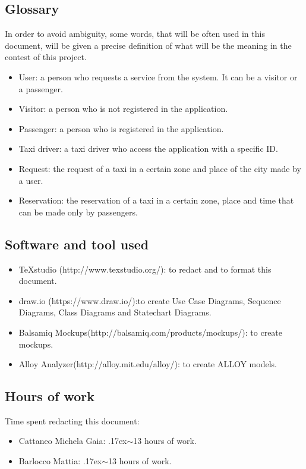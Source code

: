 \documentclass[18pt,oneside,a4paper, titlepage]{article}
\begin{document}
	\subsection{Glossary}
		In order to avoid ambiguity, some words, that will be often used in this document, will be given a precise definition of what will be the meaning in the contest of this project.
		\begin{itemize}
			\item User: a person who requests a service from the system. It can be a visitor or a passenger.
			\item Visitor: a person who is not registered in the application.
			\item Passenger: a person who is registered in the application.
			\item Taxi driver: a taxi driver who access the application with a specific ID.
			\item Request: the request of a taxi in a certain zone and place of the city made by a user.
			\item Reservation: the reservation of a taxi in a certain zone, place and time that can be made only by passengers.
	\end{itemize}
	\subsection{Software and tool used}
		\begin{itemize}
			\item TeXstudio (http://www.texstudio.org/): to redact and to format this document.
			\item draw.io (https://www.draw.io/):to create Use Case Diagrams, Sequence Diagrams, Class Diagrams and Statechart Diagrams.
			\item Balsamiq Mockups(http://balsamiq.com/products/mockups/): to create mockups.
			\item Alloy Analyzer(http://alloy.mit.edu/alloy/): to create ALLOY models.
		\end{itemize}
	
	\subsection{Hours of work}
		Time spent redacting this document:
		\begin{itemize}
			\item Cattaneo Michela Gaia: {\raise.17ex\hbox{$\scriptstyle\sim$}}13 hours of work.
			\item Barlocco Mattia: {\raise.17ex\hbox{$\scriptstyle\sim$}}13 hours of work.
		\end{itemize}
\end{document}
